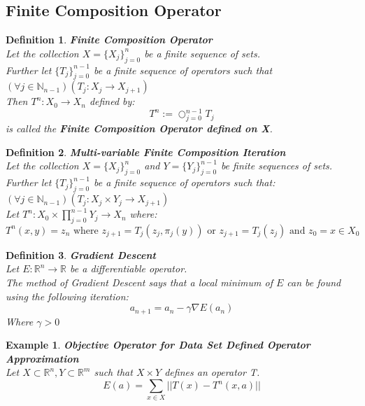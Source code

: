 \documentclass[12pt]{extarticle}
\theoremstyle{plain}
\theoremstyle{plain}
\theoremstyle{Definition}
\newtheorem{def.}{Definition}[section]
\theoremstyle{Definition}
\theoremstyle{plain}
\newtheorem{exmp}{Example}[section]
\begin{document}
\subsection{Finite Composition Operator}
\begin{def.} \textbf{Finite Composition Operator} \\ 
	Let the collection $X = \{X_j\}_{j=0}^{n}$ be a finite sequence of sets. \\ 
	Further let $\{T_j\}_{j=0}^{n-1}$ be a finite sequence of operators such that $(\forall j \in \mathbb{N}_{n-1})(T_j : X_j \to X_{j+1})$ \\ 
	Then $T^n : X_0 \to X_{n}$ defined by: 
	$$T^n := \bigcirc_{j=0}^{n-1} T_j$$ 
	is called the \textbf{Finite Composition Operator defined on X}. \\ 
\end{def.}
\begin{def.} \textbf{Multi-variable Finite Composition Iteration} \\ 
	Let the collection $X = \{X_j\}_{j=0}^n$ and $Y = \{Y_j\}_{j=0}^{n-1}$ be finite sequences of sets. \\ 
	Further let $\{T_j\}_{j=0}^{n-1}$ be a finite sequence of operators such that: $(\forall j \in \mathbb{N}_{n-1})(T_j : X_j \times Y_j \to X_{j+1})$ \\
	Let $T^n : X_0 \times \prod_{j=0}^{n-1}Y_j \to X_n$ where: \\ 
	$$T^n (x,y) = z_n \text{ where } z_{j+1} = T_j( z_{j},\pi_j (y) ) \text{ or } z_{j+1} = T_j( z_{j} )  \text{ and } z_0 = x \in X_0$$
\end{def.}
\begin{def.} \textbf{Gradient Descent} \\ 
Let $E : \mathbb{R}^n \to \mathbb{R}$ be a differentiable operator. \\ 
The method of Gradient Descent says that a local minimum of $E$ can be found using the following iteration: \\ 
$$a_{n+1} = a_n - \gamma \nabla E(a_n)$$
Where $\gamma > 0$ \\ 
\end{def.}
\begin{exmp} \textbf{Objective Operator for Data Set Defined Operator Approximation} \\ 		
Let $X \subset \mathbb{R}^n, Y \subset \mathbb{R}^m$ such that $X\times Y$ defines an operator T. \\ 
$$E(a) = \sum_{x \in X} ||T(x) - T^n(x,a)||$$ 
\end{exmp}
\newpage
\end{document}
